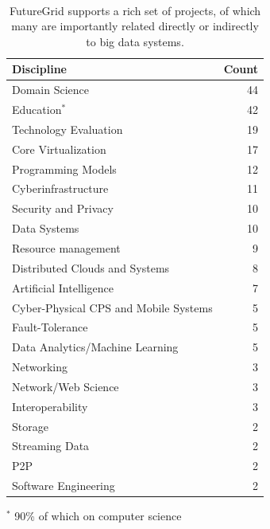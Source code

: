 \documentclass[graybox]{svmult}
\begin{document}
\begin{table}[htb]
\caption{FutureGrid supports a rich set of projects, of which many are importantly related directly or indirectly to big data systems.}
\label{T:discipline}
~\
\begin{center}
\begin{tabular}{lr}
{\bf Discipline} & {\bf Count}\\
\hline
Domain Science & 44 \\
Education$^{*}$ & 42\\
Technology Evaluation & 19 \\
Core Virtualization & 17 \\
Programming Models & 12 \\
Cyberinfrastructure & 11 \\ 
Security and Privacy & 10 \\
Data Systems & 10 \\
Resource management & 9 \\
Distributed Clouds and Systems & 8 \\
Artificial Intelligence & 7 \\
Cyber-Physical CPS and Mobile Systems & 5 \\
Fault-Tolerance & 5 \\
Data Analytics/Machine Learning & 5 \\
Networking & 3 \\
Network/Web Science & 3 \\
Interoperability & 3 \\
Storage & 2 \\
Streaming Data & 2 \\
P2P & 2 \\
Software Engineering & 2 \\
\end{tabular}
\end{center}

$^{*}$ 90\% of which on computer science
\end{table}
\end{document}
